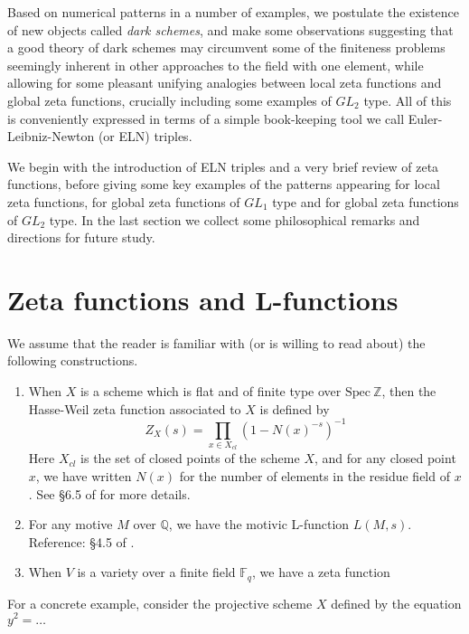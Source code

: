 \documentclass[paper=a4, fontsize=11pt]{scrartcl} %
\numberwithin{equation}{section} %
\numberwithin{figure}{section} %
\numberwithin{table}{section} %
\begin{document}
Based on numerical patterns in a number of examples, we postulate the existence of new objects called \emph{dark schemes}, and make some observations suggesting that a good theory of dark schemes may circumvent some of the finiteness problems seemingly inherent in other approaches to the field with one element, while allowing for some pleasant unifying analogies between local zeta functions and global zeta functions, crucially including some examples of $GL_2$ type. All of this is conveniently expressed in terms of a simple book-keeping tool we call Euler-Leibniz-Newton (or ELN) triples.

We begin with the introduction of ELN triples and a very brief review of zeta functions, before giving some key examples of the patterns appearing for local zeta functions, for global zeta functions of $GL_1$ type and for global zeta functions of $GL_2$ type. In the last section we collect some philosophical remarks and directions for future study.





\section{Zeta functions and L-functions}

We assume that the reader is familiar with (or is willing to read about) the following constructions.

\begin{enumerate}

\item When $X$ is a scheme which is flat and of finite type over $\mathrm{Spec} \ \mathbb{Z}$, then the Hasse-Weil zeta function associated to $X$ is defined by
$$ Z_X(s) = \prod_{x \in X_{cl}} \left( 1 - N(x)^{-s}   \right)^{-1}  $$
Here $X_{cl}$ is the set of closed points of the scheme $X$, and for any closed point $x$, we have written $N(x)$ for the number of elements in the residue field of $x$. See \S 6.5 of \cite{Mustata} for more details.
\item For any motive $M$ over $\mathbb{Q}$, we have the motivic L-function $L(M, s)$. Reference: \S 4.5 of \cite{Farmer17}.
\item When $V$ is a variety over a finite field $\mathbb{F}_q$, we have a zeta function

\end{enumerate}

For a concrete example, consider the projective scheme $X$ defined by the equation
$  y^2 = \ldots $
\end{document}
